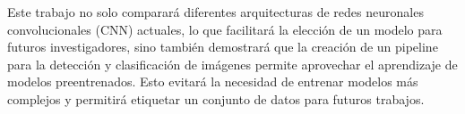 Este trabajo no solo comparará diferentes arquitecturas 
de redes neuronales convolucionales (CNN) actuales, lo que facilitará la 
elección de un modelo para futuros investigadores, sino también demostrará 
que la creación de un pipeline para la detección y clasificación de 
imágenes permite aprovechar el aprendizaje de modelos preentrenados. Esto 
evitará la necesidad de entrenar modelos más complejos y permitirá etiquetar 
un conjunto de datos para futuros trabajos.